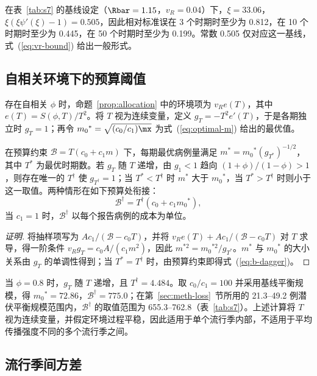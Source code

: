 在表~\ref{tab:s7} 的基线设定（$\Rbar=1.15$，$v_R=0.04$）下，$\xi=33.06$，$\xi(\xi\psi'(\xi)-1)=0.505$，因此相对标准误在 3 个时期时至少为 0.812，在 10 个时期时至少为 0.445，在 50 个时期时至少为 0.199。常数 0.505 仅对应这一基线，式~(\ref{eq:vr-bound}) 给出一般形式。

\subsection{自相关环境下的预算阈值}
\label{app:budget-ar}

存在自相关 $\phi$ 时，命题~\ref{prop:allocation} 中的环境项为 $v_Re(T)$，其中 $e(T)=S(\phi,T)/T^2$。将 $T$ 视为连续变量，定义 $g_T=-T^2e'(T)$，于是各期独立时 $g_T=1$；再令 $m_0{}^*=\sqrt{(c_0/c_1)\mx}$ 为式~(\ref{eq:optimal-m}) 给出的最优值。

\begin{proposition}[预算阈值]
\label{prop:budget-ar}
在预算约束 $\mathcal{B}=T(c_0+c_1m)$ 下，每期最优病例量满足 $m^*=m_0{}^*(g_{T^*})^{-1/2}$，其中 $T^*$ 为最优时期数。若 $g_T$ 随 $T$ 递增，由 $g_1<1$ 趋向 $(1+\phi)/(1-\phi)>1$，则存在唯一的 $T^\dagger$ 使 $g_{T^\dagger}=1$；当 $T^*<T^\dagger$ 时 $m^*$ 大于 $m_0{}^*$，当 $T^*>T^\dagger$ 时则小于这一取值。两种情形在如下预算处衔接：
\begin{equation}
  \mathcal{B}^\dagger=T^\dagger\left(c_0+c_1m_0{}^*\right),
  \label{eq:b-dagger}
\end{equation}
当 $c_1=1$ 时，$\mathcal{B}^\dagger$ 以每个报告病例的成本为单位。
\end{proposition}

\begin{proof}[证明]
将抽样项写为 $Ac_1/(\mathcal{B}-c_0T)$，并将 $v_Re(T)+Ac_1/(\mathcal{B}-c_0T)$ 对 $T$ 求导，得一阶条件 $v_Rg_T=c_0A/(c_1m^2)$，因此 $m^{*2}=m_0{}^{*2}/g_{T^*}$。$m^*$ 与 $m_0{}^*$ 的大小关系由 $g_T$ 的单调性得到；当 $T^*=T^\dagger$ 时，由预算约束即得式~(\ref{eq:b-dagger})。
\end{proof}

当 $\phi=0.8$ 时，$g_T$ 随 $T$ 递增，且 $T^\dagger=4.484$。取 $c_0/c_1=100$ 并采用基线平衡规模，得 $m_0{}^*=72.86$，$\mathcal{B}^\dagger=775.0$；在第~\ref{sec:meth-loss}~节所用的 21.3--49.2 例潜伏平衡规模范围内，$\mathcal{B}^\dagger$ 的取值范围为 655.3--762.8（表~\ref{tab:s7}）。上述计算将 $T$ 视为连续变量，并假定环境过程平稳，因此适用于单个流行季内部，不适用于平均传播强度不同的多个流行季之间。

\subsection{流行季间方差}
\label{app:seasons}

